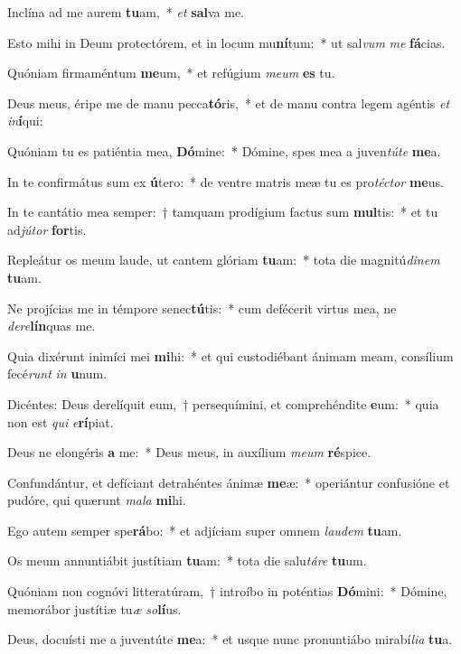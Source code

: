 \item Inclína ad me aurem \textbf{tu}am,~* \textit{et} \textbf{sal}va me.
\item Esto mihi in Deum protectórem, et in locum mu\textbf{ní}tum:~* ut sal\textit{vum} \textit{me} \textbf{fá}cias.
\item Quóniam firmaméntum \textbf{me}um,~* et refúgium \textit{me}\textit{um} \textbf{es} tu.
\item Deus meus, éripe me de manu pecca\textbf{tó}ris,~* et de manu contra legem agéntis \textit{et} \textit{in}\textbf{í}qui:
\item Quóniam tu es patiéntia mea, \textbf{Dó}mine:~* Dómine, spes mea a juven\textit{tú}\textit{te} \textbf{me}a.
\item In te confirmátus sum ex \textbf{ú}tero:~* de ventre matris meæ tu es pro\textit{téc}\textit{tor} \textbf{me}us.
\item In te cantátio mea semper:~† tamquam prodígium factus sum \textbf{mul}tis:~* et tu ad\textit{jú}\textit{tor} \textbf{for}tis.
\item Repleátur os meum laude, ut cantem glóriam \textbf{tu}am:~* tota die magnitú\textit{di}\textit{nem} \textbf{tu}am.
\item Ne projícias me in témpore senec\textbf{tú}tis:~* cum defécerit virtus mea, ne \textit{de}\textit{re}\textbf{lín}quas me.
\item Quia dixérunt inimíci mei \textbf{mi}hi:~* et qui custodiébant ánimam meam, consílium fecé\textit{runt} \textit{in} \textbf{u}num.
\item Dicéntes: Deus derelíquit eum,~† persequímini, et comprehéndite \textbf{e}um:~* quia non est \textit{qui} \textit{e}\textbf{rí}piat.
\item Deus ne elongéris \textbf{a} me:~* Deus meus, in auxílium \textit{me}\textit{um} \textbf{ré}spice.
\item Confundántur, et defíciant detrahéntes ánimæ \textbf{me}æ:~* operiántur confusióne et pudóre, qui quærunt \textit{ma}\textit{la} \textbf{mi}hi.
\item Ego autem semper spe\textbf{rá}bo:~* et adjíciam super omnem \textit{lau}\textit{dem} \textbf{tu}am.
\item Os meum annuntiábit justítiam \textbf{tu}am:~* tota die salu\textit{tá}\textit{re} \textbf{tu}um.
\item Quóniam non cognóvi litteratúram,~† introíbo in poténtias \textbf{Dó}mini:~* Dómine, memorábor justítiæ tu\textit{æ} \textit{so}\textbf{lí}us.
\item Deus, docuísti me a juventúte \textbf{me}a:~* et usque nunc pronuntiábo mirabí\textit{li}\textit{a} \textbf{tu}a.
